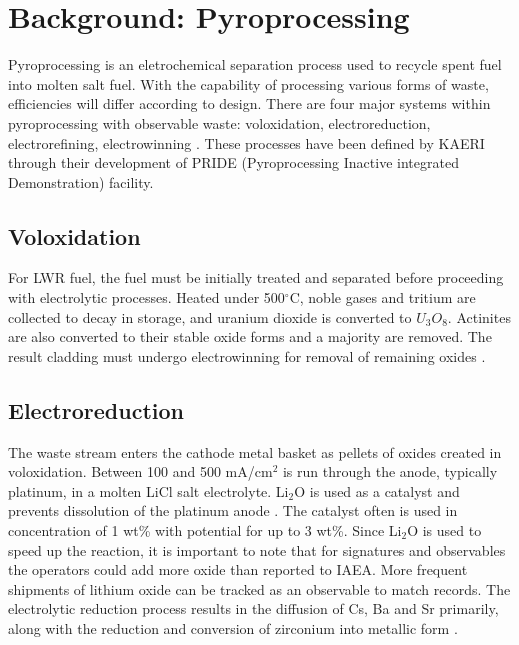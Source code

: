 \documentclass{anstrans}
\begin{document}
\section{Background: Pyroprocessing}
Pyroprocessing is an eletrochemical separation process used to recycle spent fuel into molten salt fuel. With the capability of processing various forms of waste, efficiencies will differ according to design. There are four major systems within pyroprocessing with observable waste: voloxidation, electroreduction, electrorefining, electrowinning \cite{Borrelli_2017} . These processes have been defined by KAERI through their development of PRIDE (Pyroprocessing Inactive integrated Demonstration) facility. 

\subsection{Voloxidation}

For LWR fuel, the fuel must be initially treated and separated before proceeding with electrolytic processes. Heated under 500$^{\circ}$C, noble gases and tritium are collected to decay in storage, and uranium dioxide is converted to $U_3O_8$. Actinites are also converted to their stable oxide forms and a majority are removed. The result cladding must undergo electrowinning for removal of remaining oxides \cite{flowsheet_1998}. 

\subsection{Electroreduction}

The waste stream enters the cathode metal basket as pellets of oxides created in voloxidation. Between 100 and 500 mA/cm$^2$ is run through the anode, typically platinum, in a molten LiCl salt electrolyte. Li$_2$O is used as a catalyst and prevents dissolution of the platinum anode \cite{choi_electrochemical_2015}. The catalyst often is used in concentration of 1 wt\% with potential for up to 3 wt\%. Since Li$_2$O is used to speed up the reaction, it is important to note that for signatures and observables the operators could add more oxide than reported to IAEA. More frequent shipments of lithium oxide can be tracked as an observable to match records. The electrolytic reduction process results in the diffusion of Cs, Ba and Sr primarily, along with the reduction and conversion of zirconium into metallic form \cite{choi_electrochemical_2015,flowsheet_1998}.
\end{document}
